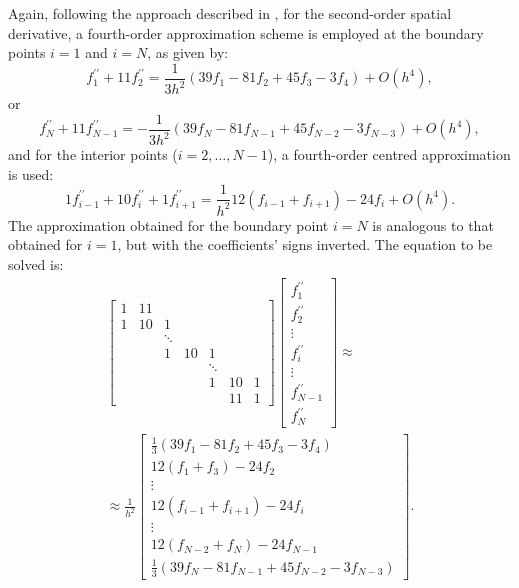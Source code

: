 \documentclass[preprint, 12pt]{elsarticle}
\begin{document}
Again, following the approach described in \citet{souza2003}, for the second-order spatial derivative, a fourth-order approximation scheme is employed at the boundary points $i=1$ and $i=N$, as given by:
\begin{equation}
    f_1^{\prime \prime} + 11f_{2}^{\prime \prime} = \frac{1}{3h^{2}}\left(39f_{1} - 81f_{2} + 45f_{3} - 3f_{4}\right)+O\left(h^4\right),
\end{equation}
or
\begin{equation}
    f_{N}^{\prime \prime} + 11f_{N-1}^{\prime \prime} = -\frac{1}{3h^{2}}\left(39f_{N} - 81f_{N-1} + 45f_{N-2} - 3f_{N-3}\right)+O\left(h^4\right),
\end{equation}
and for the interior points ($i = 2, \dots, N-1$), a fourth-order centred approximation is used:
\begin{equation}
    1 f_{i-1}^{\prime \prime}+10 f_i^{\prime \prime}+1 f_{i+1}^{\prime \prime}=\frac{1}{ h^2}12\left(f_{i-1} + f_{i+1}\right) -24f_{i}+O\left(h^4\right) .
\end{equation}
The approximation obtained for the boundary point $i=N$ is analogous to that obtained for $i=1$, but with the coefficients' signs inverted. The equation to be solved is:
\begin{align}
\left[\begin{array}{ccccccc}
    1 & 11 & & & & & \\
    1 & 10 & 1 & & & & \\
    & & \ddots & & & & \\
    & & 1 & 10 & 1 & & \\
    & & & & \ddots & & \\
    & & & & 1 & 10 & 1 \\
    & & & & & 11 & 1
\end{array}\right]\left[\begin{array}{c}
    f_1^{\prime \prime} \\
    f_2^{\prime \prime} \\
    \vdots \\
    f_i^{\prime \prime} \\
    \vdots \\
    f_{N-1}^{\prime \prime} \\
    f_N^{\prime \prime}
\end{array}\right] \approx \nonumber\\ \approx \frac{1}{h^2}\left[\begin{array}{c}\frac{1}{3}\left(39f_1 - 81f_2 + 45f_3 - 3f_4\right) \\ 12\left(f_1 + f_3\right) -24f_2 \\ \vdots \\ 12\left(f_{i-1} + f_{i+1}\right) -24f_{i} \\ \vdots \\ 12\left(f_{N-2} + f_{N}\right) -24f_{N-1}  \\ \frac{1}{3}\left(39f_{N} - 81f_{N-1} + 45f_{N-2} - 3f_{N-3}\right)\end{array}\right].
\end{align}
\end{document}
